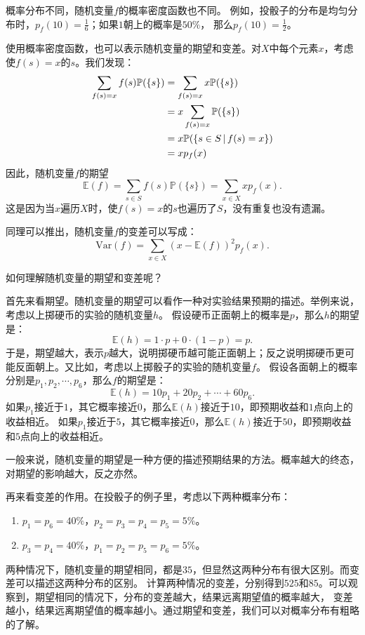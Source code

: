 \documentclass[12pt,UTF8]{ctexbook}
\begin{document}
概率分布不同，随机变量$f$的概率密度函数也不同。
例如，投骰子的分布是均匀分布时，$p_f(10) = \frac{1}{6}$；如果$1$朝上的概率是$50\%$，
那么$p_f(10) = \frac{1}{2}$。

使用概率密度函数，也可以表示随机变量的期望和变差。对$X$中每个元素$x$，考虑使$f(s) = x$的$s$。我们发现：
\begin{align}
    \sum_{f(s) = x} f(s) \mathbb{P}(\{s\}) &= \sum_{f(s) = x} x \mathbb{P}(\{s\}) \notag \\
    &= x \sum_{f(s) = x} \mathbb{P}(\{s\}) \notag \\
    &= x \mathbb{P}(\{s \in S \,|\, f(s) = x\}) \notag \\
    &= x p_f(x) \notag  
\end{align}
因此，随机变量$f$的期望
$$ \mathbb{E}(f) = \sum_{s\in S} f(s) \mathbb{P}(\{s\}) = \sum_{x \in X} x p_f(x). $$
这是因为当$x$遍历$X$时，使$f(s) = x$的$s$也遍历了$S$，没有重复也没有遗漏。

同理可以推出，随机变量$f$的变差可以写成：
$$ \mathrm{Var}(f)  = \sum_{x\in X} \left(x - \mathbb{E}(f)\right)^2 p_f(x).$$ 

如何理解随机变量的期望和变差呢？

首先来看期望。随机变量的期望可以看作一种对实验结果预期的描述。举例来说，考虑以上掷硬币的实验的随机变量$h$。
假设硬币正面朝上的概率是$p$，那么$h$的期望是：
$$ \mathbb{E}(h) = 1\cdot p + 0\cdot (1 - p) = p. $$
于是，期望越大，表示$p$越大，说明掷硬币越可能正面朝上；反之说明掷硬币更可能反面朝上。又比如，考虑以上掷骰子的实验的随机变量$f$。
假设各面朝上的概率分别是$p_1, p_2, \cdots , p_6$，那么$f$的期望是：
$$ \mathbb{E}(h) = 10p_1 + 20p_2 + \cdots + 60p_6. $$
如果$p_1$接近于$1$，其它概率接近$0$，那么$\mathbb{E}(h)$接近于$10$，即预期收益和$1$点向上的收益相近。
如果$p_1$接近于$5$，其它概率接近$0$，那么$\mathbb{E}(h)$接近于$50$，即预期收益和$5$点向上的收益相近。

一般来说，随机变量的期望是一种方便的描述预期结果的方法。概率越大的终态，对期望的影响越大，反之亦然。

再来看变差的作用。在投骰子的例子里，考虑以下两种概率分布：
\begin{enumerate}
    \item $p_1 = p_6 = 40\%$，$p_2 = p_3 = p_4 = p_5 = 5\%$。
    \item $p_3 = p_4 = 40\%$，$p_1 = p_2 = p_5 = p_6 = 5\%$。
\end{enumerate}
两种情况下，随机变量的期望相同，都是$35$，但显然这两种分布有很大区别。而变差可以描述这两种分布的区别。
计算两种情况的变差，分别得到$525$和$85$。可以观察到，期望相同的情况下，分布的变差越大，结果远离期望值的概率越大，
变差越小，结果远离期望值的概率越小。通过期望和变差，我们可以对概率分布有粗略的了解。
\end{document}
